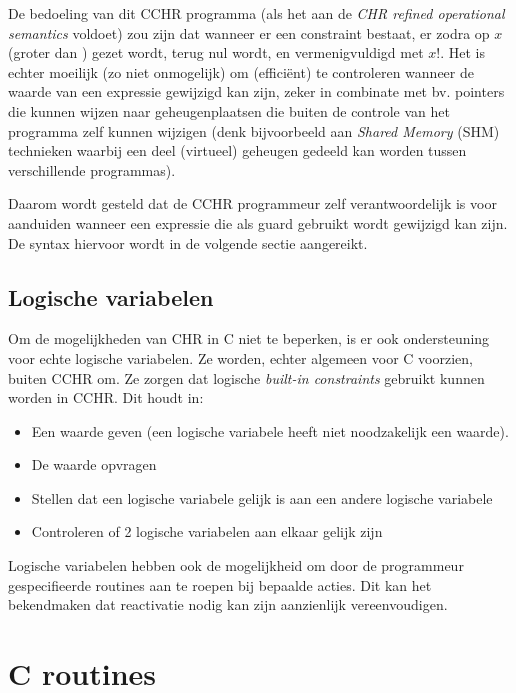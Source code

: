 De bedoeling van dit CCHR programma (als het aan de {\em CHR refined operational semantics} voldoet) zou zijn dat wanneer er een  constraint bestaat, er zodra  op $x$ (groter dan ) gezet wordt,  terug nul wordt, en  vermenigvuldigd met $x!$. Het is echter moeilijk (zo niet onmogelijk) om (effici\"ent) te controleren wanneer de waarde van een expressie gewijzigd kan zijn, zeker in combinate met bv. pointers die kunnen wijzen naar geheugenplaatsen die buiten de controle van het programma zelf kunnen wijzigen (denk bijvoorbeeld aan {\em Shared Memory} (SHM) technieken waarbij een deel (virtueel) geheugen gedeeld kan worden tussen verschillende programmas).

Daarom wordt gesteld dat de CCHR programmeur zelf verantwoordelijk is voor aanduiden wanneer een expressie die als guard gebruikt
wordt gewijzigd kan zijn. De syntax hiervoor wordt in de volgende sectie aangereikt.

\subsection{Logische variabelen}

Om de mogelijkheden van CHR in C niet te beperken, is er ook ondersteuning voor echte logische variabelen. Ze worden, echter
algemeen voor C voorzien, buiten CCHR om. Ze zorgen dat logische {\em built-in constraints} gebruikt kunnen worden in
CCHR. Dit houdt in: \begin{itemize}
  \item Een waarde geven (een logische variabele heeft niet noodzakelijk een waarde).
  \item De waarde opvragen
  \item Stellen dat een logische variabele gelijk is aan een andere logische variabele
  \item Controleren of 2 logische variabelen aan elkaar gelijk zijn
\end{itemize}

Logische variabelen hebben ook de mogelijkheid om door de programmeur gespecifieerde routines aan te roepen bij bepaalde acties. Dit kan het bekendmaken dat reactivatie nodig kan zijn aanzienlijk vereenvoudigen. 


\section{C routines}

